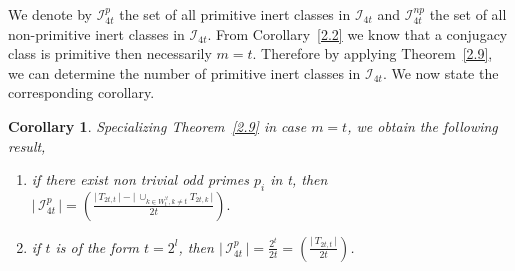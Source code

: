 \documentclass[a4paper,12pt]{amsart}
\numberwithin{equation}{section}
\newtheorem{cor}[theorem]{Corollary}
\theoremstyle{definition}
\newcommand{\thmref}[1]{Theorem~\ref{#1}}
\newcommand{\corref}[1]{Corollary~\ref{#1}}
\numberwithin{equation}{section}
\begin{document}
\medskip 

We denote by $\mathscr{I}^p_{4t}$ the set of all primitive inert classes in $\mathscr{I}_{4t}$ and $\mathscr{I}^{np}_{4t}$ the set of all non-primitive inert classes in $\mathscr{I}_{4t}$.  From \corref{2.2} we know that a conjugacy class is primitive then necessarily $m = t$. Therefore by applying \thmref{2.9}, we can determine the number of primitive inert classes in $\mathscr{I}_{4t}$. 
We now state the corresponding corollary.
\begin{cor} \label{2.10}Specializing \thmref{2.9} in case $m=t$, we obtain the following result,
  \begin{enumerate}
  \item if there exist non trivial odd primes $p_i$ in t, then $\lvert \,\mathscr{I}^p_{4t}\,\rvert =\left ( \frac{\lvert\, T_{2t,t} \,\rvert- \lvert\,\cup_{k\in W_t^{'t}, k \neq t} T_{2t,k}\,\rvert}{2t}\right).$ 
  \item if $t$ is of the form $t =2^l$, then  $\lvert \,\mathscr{I}^p_{4t}\,\rvert = \frac{2^{t}}{2t}=\left (\frac{\lvert\, T_{2t,t} \,\rvert}{2t}\right)$.
\end{enumerate}
\end{cor}
\end{document}
